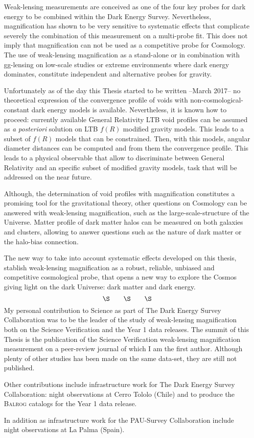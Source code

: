 Weak-lensing measurements are conceived as one of the four key probes for dark energy to be combined within the Dark Energy Survey. Nevertheless, magnification has shown to be very sensitive to systematic effects that complicate severely the combination of this measurement on a multi-probe fit. This does not imply that magnification can not be used as a competitive probe for Cosmology. The use of weak-lensing magnification as a stand-alone or in combination with gg-lensing on low-scale studies or extreme environments where dark energy dominates, constitute independent and alternative probes for gravity.
\newline

Unfortunately as of the day this Thesis started to be written --March 2017-- no theoretical expression of the convergence profile of voids with non-cosmological-constant dark energy models is available. Nevertheless, it is known how to proceed: currently available General Relativity LTB void profiles can be assumed as {\it a posteriori} solution on LTB $f(R)$ modified gravity models. This leads to a subset of $f(R)$ models that can be constrained. Then, with this models, angular diameter distances can be computed and from them the convergence profile. This leads to a physical observable that allow to discriminate between General Relativity and an specific subset of modified gravity models, task that will be addressed on the near future.
\newline

Although, the determination of void profiles with magnification constitutes a promising tool for the gravitational theory, other questions on Cosmology can be answered with weak-lensing magnification, such as the large-scale-structure of the Universe. Matter profile of dark matter halos can be measured on both galaxies and clusters, allowing to answer questions such as the nature of dark matter or the halo-bias connection.
\newline

The new way to take into account systematic effects developed on this thesis, stablish weak-lensing magnification as a robust, reliable, unbiased and competitive cosmological probe, that opens a new way to explore the Cosmos giving light on the dark Universe: dark matter and  dark energy.
$$\S\qquad \S\qquad \S$$
My personal contribution to Science as part of The Dark Energy Survey Collaboration was to be the leader of the study of weak-lensing magnification both on the Science Verification and the Year 1 data releases. The summit of this Thesis is the publication of the Science Verification weak-lensing magnification measurement on a peer-review journal of which I am the first author. Although plenty of other studies has been made on the same data-set, they are still not published.
\newline

Other contributions include infrastructure work for The Dark Energy Survey Collaboration: night observations at Cerro Tololo (Chile) and to produce the {\scshape Balrog} catalogs for the Year 1 data release.
\newline

In addition as infrastructure work for the PAU-Survey Collaboration include night observations at La Palma (Spain).
